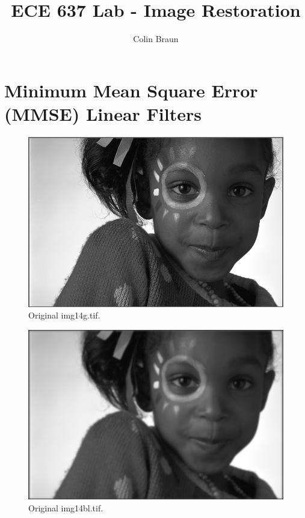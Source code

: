 \documentclass{article}
\title{ECE 637 Lab - Image Restoration}
\author{Colin Braun}
\begin{document}
\maketitle

\section{Minimum Mean Square Error (MMSE) Linear Filters}
\begin{figure}[H]
    \centering
    \includegraphics[width=1\textwidth]{../img14g.png}
    \caption{Original img14g.tif.}
\end{figure}
\begin{figure}[H]
    \centering
    \includegraphics[width=1\textwidth]{../img14bl.png}
    \caption{Original img14bl.tif.}
\end{figure}
\end{document}

